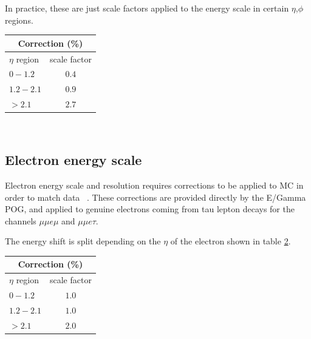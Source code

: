 In practice, these are just scale factors applied to the energy scale in certain $\eta$,$\phi$ regions. \\
\begin{table}[h]
  \begin{center}
    \label{tab:MES}
    \begin{tabular} { l | c }
      \hline \multicolumn{2}{c}{Correction (\%)} \\
      \hline $\eta$ region & scale factor  \\ \hline
      $0 - 1.2$ & $0.4$ \\ 
      $1.2 - 2.1 $& $0.9 $\\ 
      $> 2.1$ & $2.7$ \\ 
    \end{tabular}
  \end{center}
\end{table}\\

\subsection{Electron energy scale}

Electron energy scale and resolution requires corrections to be applied to MC in order to match data ~\cite{EGammaEnergyScale}. These corrections are provided directly by the E/Gamma POG, and applied to genuine electrons coming from tau lepton decays for the channels $\mu\mu e \mu$ and $\mu\mu e \tau$.

The energy shift is split depending on the $\eta$ of the electron shown in table \ref{tab:EES}.\\
\begin{table}[h]
  \begin{center}
    \label{tab:EES}
    \begin{tabular} { l | c }
      \hline \multicolumn{2}{c}{Correction (\%)} \\
      \hline $\eta$ region & scale factor  \\ \hline
      $0 - 1.2$ & $1.0$ \\ 
      $1.2 - 2.1 $& $1.0 $\\ 
      $> 2.1$ & $2.0$ \\ 
    \end{tabular}
  \end{center}
\end{table}\\

